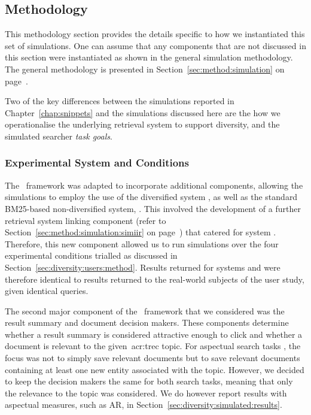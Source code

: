 \subsection{Methodology}\label{sec:diversity:simulated:method}
This methodology section provides the details specific to how we instantiated this set of simulations. One can assume that any components that are not discussed in this section were instantiated as shown in the general simulation methodology. The general methodology is presented in Section~\ref{sec:method:simulation} on page~\pageref{sec:method:simulation}.

Two of the key differences between the simulations reported in Chapter~\ref{chap:snippets} and the simulations discussed here are the how we operationalise the underlying retrieval system to support diversity, and the simulated searcher \emph{task goals}.

\subsubsection{Experimental System and Conditions}\label{sec:diversity:simulated:method:system}
The \simiir~framework was adapted to incorporate additional components, allowing the simulations to employ the use of the diversified system , as well as the standard BM25-based non-diversified system, . This involved the development of a further retrieval system linking component (refer to Section~\ref{sec:method:simulation:simiir} on page~\pageref{sec:method:simulation:simiir}) that catered for system . Therefore, this new component allowed us to run simulations over the four experimental conditions trialled as discussed in Section~\ref{sec:diversity:users:method}. Results returned for systems  and  were therefore identical to results returned to the real-world subjects of the user study, given identical queries.

The second major component of the \simiir~framework that we considered was the result summary and document decision makers. These components determine whether a result summary is considered attractive enough to click and whether a document is relevant to the given~\gls{acr:trec} topic. For aspectual search tasks , the focus was not to simply save relevant documents but to save relevant documents containing at least one new entity associated with the topic. However, we decided to keep the decision makers the same for both search tasks, meaning that only the relevance to the topic was considered. We do however report results with aspectual measures, such as AR, in Section~\ref{sec:diversity:simulated:results}.

